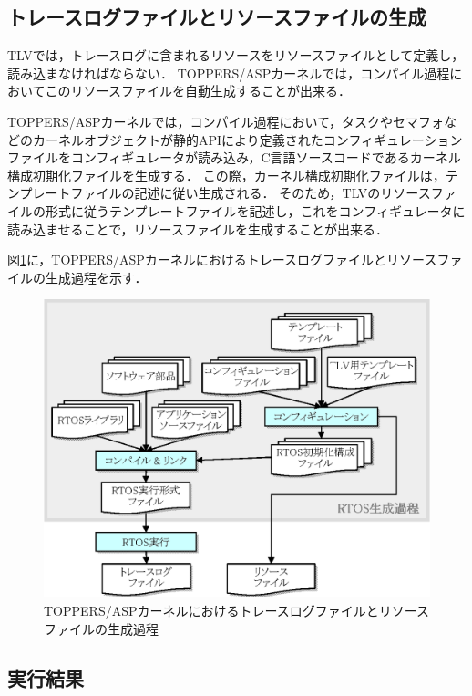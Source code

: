 \subsection{トレースログファイルとリソースファイルの生成}

TLVでは，トレースログに含まれるリソースをリソースファイルとして定義し，読み込まなければならない．
TOPPERS/ASPカーネルでは，コンパイル過程においてこのリソースファイルを自動生成することが出来る．

TOPPERS/ASPカーネルでは，コンパイル過程において，タスクやセマフォなどのカーネルオブジェクトが静的APIにより定義されたコンフィギュレーションファイルをコンフィギュレータが読み込み，C言語ソースコードであるカーネル構成初期化ファイルを生成する．
この際，カーネル構成初期化ファイルは，テンプレートファイルの記述に従い生成される．
そのため，TLVのリソースファイルの形式に従うテンプレートファイルを記述し，これをコンフィギュレータに読み込ませることで，リソースファイルを生成することが出来る．

図\ref{fig:rtosMakeProcess}に，TOPPERS/ASPカーネルにおけるトレースログファイルとリソースファイルの生成過程を示す．

\begin{figure}[!h]
\begin{center}
\includegraphics[scale=0.9]{img/rtosMakeProcess.eps}
\caption{TOPPERS/ASPカーネルにおけるトレースログファイルとリソースファイルの生成過程}
\label{fig:rtosMakeProcess}
\end{center}
\end{figure}

\subsection{実行結果}

